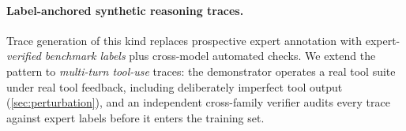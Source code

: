 \paragraph{Label-anchored synthetic reasoning traces.}
Trace generation of this kind replaces prospective expert annotation with expert-\emph{verified benchmark
labels} plus cross-model automated checks. We extend the pattern to \emph{multi-turn tool-use} traces: the demonstrator operates a real tool suite under
real tool feedback, including deliberately imperfect tool output (\cref{sec:perturbation}), and
an independent cross-family verifier audits every trace against expert labels before it enters
the training set.
